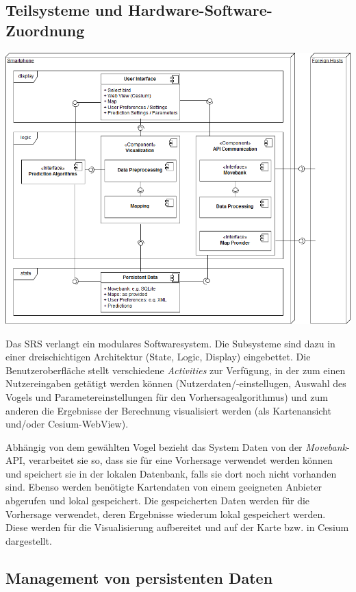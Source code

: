 \documentclass[12pt]{article} %
\begin{document}
\subsection{Teilsysteme und Hardware-Software-Zuordnung}

\includegraphics[width = \textwidth]{Diagramme/ComponentDiagram.png}

\vspace{1em}

Das SRS verlangt ein modulares Softwaresystem. Die Subsysteme sind dazu in einer dreischichtigen Architektur (State, Logic, Display) eingebettet. Die Benutzeroberfläche stellt verschiedene \textit{Activities} zur Verfügung, in der zum einen Nutzereingaben getätigt werden können (Nutzerdaten/-einstellugen, Auswahl des Vogels und Parametereinstellungen für den Vorhersagealgorithmus) und zum anderen die Ergebnisse der Berechnung visualisiert werden (als Kartenansicht und/oder Cesium-WebView).

Abhängig von dem gewählten Vogel bezieht das System Daten von der \textit{Movebank}-API, verarbeitet sie so, dass sie für eine Vorhersage verwendet werden können und speichert sie in der lokalen Datenbank, falls sie dort noch nicht vorhanden sind. Ebenso werden benötigte Kartendaten von einem geeigneten Anbieter abgerufen und lokal gespeichert. Die gespeicherten Daten werden für die Vorhersage verwendet, deren Ergebnisse wiederum lokal gespeichert werden. Diese werden für die Visualisierung aufbereitet und auf der Karte bzw. in Cesium dargestellt.

\subsection{Management von persistenten Daten}
\end{document}
